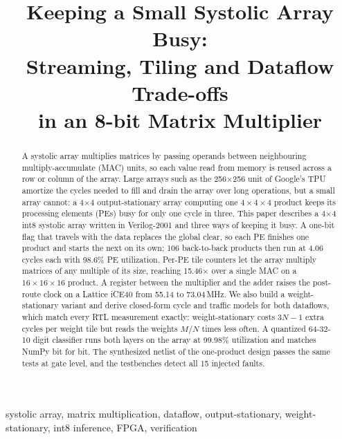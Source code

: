 \documentclass[conference]{IEEEtran}
\begin{document}
\title{Keeping a Small Systolic Array Busy:\\Streaming, Tiling and Dataflow Trade-offs\\in an 8-bit Matrix Multiplier}

\author{
}

\maketitle

\begin{abstract}
A systolic array multiplies matrices by passing operands between neighbouring multiply-accumulate (MAC) units, so each value read from memory is reused across a row or column of the array. Large arrays such as the 256$\times$256 unit of Google's TPU amortize the cycles needed to fill and drain the array over long operations, but a small array cannot: a 4$\times$4 output-stationary array computing one $4\times4\times4$ product keeps its processing elements (PEs) busy for only one cycle in three. This paper describes a 4$\times$4 int8 systolic array written in Verilog-2001 and three ways of keeping it busy. A one-bit flag that travels with the data replaces the global clear, so each PE finishes one product and starts the next on its own; 106 back-to-back products then run at 4.06 cycles each with 98.6\% PE utilization. Per-PE tile counters let the array multiply matrices of any multiple of its size, reaching 15.46$\times$ over a single MAC on a $16\times16\times16$ product. A register between the multiplier and the adder raises the post-route clock on a Lattice iCE40 from 55.14 to 73.04\,MHz. We also build a weight-stationary variant and derive closed-form cycle and traffic models for both dataflows, which match every RTL measurement exactly: weight-stationary costs $3N{-}1$ extra cycles per weight tile but reads the weights $M/N$ times less often. A quantized 64-32-10 digit classifier runs both layers on the array at 99.98\% utilization and matches NumPy bit for bit. The synthesized netlist of the one-product design passes the same tests at gate level, and the testbenches detect all 15 injected faults.
\end{abstract}

\begin{IEEEkeywords}
systolic array, matrix multiplication, dataflow, output-stationary, weight-stationary, int8 inference, FPGA, verification
\end{IEEEkeywords}
\end{document}
